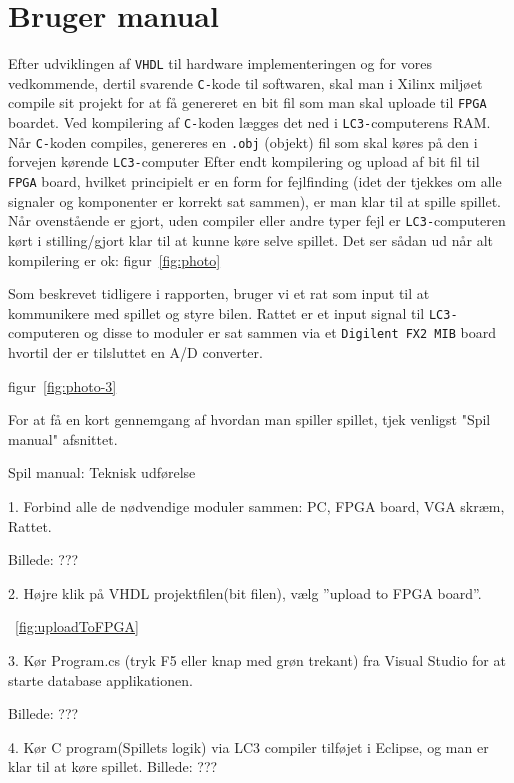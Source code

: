 \section{Bruger manual}
Efter udviklingen af \texttt{VHDL} til hardware implementeringen og for vores vedkommende, dertil svarende \texttt{C-}kode til softwaren, skal man i Xilinx miljøet compile sit projekt for at få genereret en bit fil som man skal uploade til \texttt{FPGA} boardet. Ved kompilering af \texttt{C-}koden lægges det ned i \texttt{LC3-}computerens RAM. Når \texttt{C-}koden compiles, genereres en \texttt{.obj} (objekt) fil som skal køres på den i forvejen kørende \texttt{LC3-}computer 
Efter endt kompilering og upload af bit fil til \texttt{FPGA} board, hvilket principielt er en form for fejlfinding (idet der tjekkes om alle signaler og komponenter er korrekt sat sammen), er man klar til at spille spillet. Når ovenstående er gjort, uden compiler eller andre typer fejl er \texttt{LC3-}computeren kørt i stilling/gjort klar til at kunne køre selve spillet.
Det ser sådan ud når alt kompilering er ok:
figur~\vref{fig:photo}

Som beskrevet tidligere i rapporten, bruger vi et rat som input til at kommunikere med spillet og styre bilen. Rattet er et input signal til \texttt{LC3-}computeren og disse to moduler er sat sammen via et \texttt{Digilent FX2 MIB} board hvortil der er tilsluttet en A/D converter. 

figur~\vref{fig:photo-3}

For at få en kort gennemgang af hvordan man spiller spillet, tjek venligst "Spil manual" afsnittet. 


Spil manual:
Teknisk udførelse

1. Forbind alle de nødvendige moduler sammen: PC, FPGA board, VGA skræm, Rattet.

Billede: ???


2. Højre klik på VHDL projektfilen(bit filen), vælg ”upload to FPGA board”.

~\vref{fig:uploadToFPGA}

3. Kør Program.cs (tryk F5 eller knap med grøn trekant) fra Visual Studio for at starte database applikationen. 

Billede: ???

4. Kør C program(Spillets logik) via LC3 compiler tilføjet i Eclipse, og man er klar til at køre spillet. 
Billede: ???


